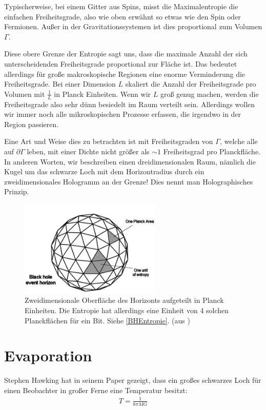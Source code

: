 \documentclass[ngerman]{scrartcl}
\begin{document}
Typischerweise, bei einem Gitter aus Spins, misst die Maximalentropie die einfachen Freiheitsgrade, also wie oben erwähnt so etwas wie den Spin oder Fermionen. Außer in der Gravitationssystemen ist dies proportional zum Volumen $\Gamma$. 

Diese obere Grenze der Entropie sagt uns, dass die maximale Anzahl der sich unterscheidenden Freiheitsgrade proportional zur Fläche ist. Das bedeutet allerdings für große makroskopische Regionen eine enorme Verminderung die Freiheitsgrade. Bei einer Dimension $L$ skaliert die Anzahl der Freiheitsgrade pro Volumen mit $\frac{1}{L}$ in Planck Einheiten.
Wenn wir $L$ groß genug machen, werden die Freiheitsgrade also sehr dünn besiedelt im Raum verteilt sein. Allerdings wollen wir immer noch alle mikroskopischen Prozesse erfassen, die irgendwo in der Region passieren. 

Eine Art und Weise dies zu betrachten ist mit Freiheitsgraden von $\Gamma$, welche alle auf $\partial \Gamma$ leben, mit einer Dichte nicht größer als $\sim 1$ Freiheitsgrad pro Planckfläche. In anderen Worten, wir beschreiben einen dreidimensionalen Raum, nämlich die Kugel um das schwarze Loch mit dem Horizontradius durch ein zweidimensionales Hologramm an der Grenze! Dies nennt man Holographisches Prinzip. 

	\begin{figure}
		\begin{center}
			\includegraphics[width=0.6\textwidth]{BHentropy1}
		\end{center}
		\caption{Zweidimensionale Oberfläche des Horizonts aufgeteilt in Planck Einheiten. Die Entropie hat allerdings eine Einheit von 4 solchen Planckflächen für ein Bit. Siehe \ref{BHEntropie}. (aus )}
	\end{figure} 

\section{Evaporation}
Stephen Hawking hat in seinem Paper \cite{ParticleCreation} gezeigt, dass ein großes schwarzes Loch für einen Beobachter in großer Ferne eine Temperatur besitzt:
\begin{align}
T = \frac{1}{8 \pi MG}
\end{align}
\end{document}
